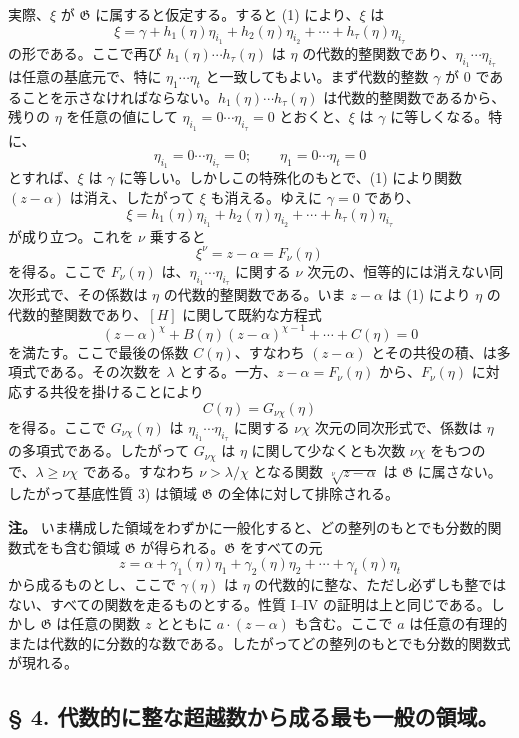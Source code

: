 実際、$\xi$ が $\mathfrak G$ に属すると仮定する。すると (1) により、$\xi$ は
\[
 \xi=\gamma+h_1(\eta)\eta_{i_1}+h_2(\eta)\eta_{i_2}
      +\cdots+h_\tau(\eta)\eta_{i_\tau}
\]
の形である。ここで再び $h_1(\eta)\cdots h_\tau(\eta)$ は $\eta$ の代数的整関数であり、$\eta_{i_1}\cdots\eta_{i_\tau}$ は任意の基底元で、特に $\eta_1\cdots\eta_t$ と一致してもよい。まず代数的整数 $\gamma$ が 0 であることを示さなければならない。$h_1(\eta)\cdots h_\tau(\eta)$ は代数的整関数であるから、残りの $\eta$ を任意の値にして $\eta_{i_1}=0\cdots\eta_{i_\tau}=0$ とおくと、$\xi$ は $\gamma$ に等しくなる。特に、
\[
 \eta_{i_1}=0\cdots \eta_{i_\tau}=0; \qquad
 \eta_1=0\cdots \eta_t=0
\]
とすれば、$\xi$ は $\gamma$ に等しい。しかしこの特殊化のもとで、(1) により関数 $(z-\alpha)$ は消え、したがって $\xi$ も消える。ゆえに $\gamma=0$ であり、
\[
 \xi=h_1(\eta)\eta_{i_1}+h_2(\eta)\eta_{i_2}
      +\cdots+h_\tau(\eta)\eta_{i_\tau}
\]
が成り立つ。これを $\nu$ 乗すると
\[
 \xi^\nu=z-\alpha=F_\nu(\eta)
\]
を得る。ここで $F_\nu(\eta)$ は、$\eta_{i_1}\cdots\eta_{i_\tau}$ に関する $\nu$ 次元の、恒等的には消えない同次形式で、その係数は $\eta$ の代数的整関数である。いま $z-\alpha$ は (1) により $\eta$ の代数的整関数であり、$[H]$ に関して既約な方程式
\[
 (z-\alpha)^\chi+B(\eta)(z-\alpha)^{\chi-1}+\cdots+C(\eta)=0
\]
を満たす。ここで最後の係数 $C(\eta)$、すなわち $(z-\alpha)$ とその共役の積、は多項式である。その次数を $\lambda$ とする。一方、$z-\alpha=F_\nu(\eta)$ から、$F_\nu(\eta)$ に対応する共役を掛けることにより
\[
 C(\eta)=G_{\nu\chi}(\eta)
\]
を得る。ここで $G_{\nu\chi}(\eta)$ は $\eta_{i_1}\cdots\eta_{i_\tau}$ に関する $\nu\chi$ 次元の同次形式で、係数は $\eta$ の多項式である。したがって $G_{\nu\chi}$ は $\eta$ に関して少なくとも次数 $\nu\chi$ をもつので、$\lambda\geq\nu\chi$ である。すなわち $\nu>\lambda/\chi$ となる関数 $\sqrt[\nu]{z-\alpha}$ は $\mathfrak G$ に属さない。したがって基底性質 3) は領域 $\mathfrak G$ の全体に対して排除される。

\textbf{注。} いま構成した領域をわずかに一般化すると、どの整列のもとでも分数的関数式をも含む領域 $\mathfrak G$ が得られる。$\mathfrak G$ をすべての元
\[
 z=\alpha+\gamma_1(\eta)\eta_1+\gamma_2(\eta)\eta_2
      +\cdots+\gamma_t(\eta)\eta_t
\]
から成るものとし、ここで $\gamma(\eta)$ は $\eta$ の代数的に整な、ただし必ずしも整ではない、すべての関数を走るものとする。性質 I--IV の証明は上と同じである。しかし $\mathfrak G$ は任意の関数 $z$ とともに $a\cdot(z-\alpha)$ も含む。ここで $a$ は任意の有理的または代数的に分数的な数である。したがってどの整列のもとでも分数的関数式が現れる。

\subsection*{§ 4. 代数的に整な超越数から成る最も一般の領域。}


